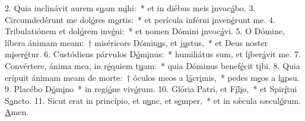 2. Quia inclinávit aurem s\uline{u}am m\uline{i}hi:~* et in diébus meis \uline{i}nvoc\uline{á}bo.
3. Circumdedérunt me dol\uline{ó}res m\uline{o}rtis:~* et perícula inférni \uline{i}nven\uline{é}runt me.
4. Tribulatiónem et dol\uline{ó}rem inv\uline{é}ni:~* et nomen Dómini \uline{i}nvoc\uline{á}vi.
5. O Dómine, líbera ánimam meam:~† miséricors Dómin\uline{u}s, et j\uline{u}stus,~* et Deus noster m\uline{i}ser\uline{é}tur.
6. Custódiens párvulos D\uline{ó}m\uline{i}nus:~* humiliátus sum, et l\uline{i}ber\uline{á}vit me.
7. Convértere, ánima mea, in r\uline{é}quiem t\uline{u}am:~* quia Dóminus benef\uline{é}cit t\uline{i}bi.
8. Quia erípuit ánimam meam de morte:~† óculos meos a l\uline{á}cr\uline{i}mis,~* pedes m\uline{e}os a l\uline{a}psu.
9. Placébo D\uline{ó}m\uline{i}no~* in regi\uline{ó}ne viv\uline{ó}rum.
10. Glória Patri, et F\uline{í}l\uline{i}o,~* et Spir\uline{í}tui S\uline{a}ncto.
11. Sicut erat in princípio, et n\uline{u}nc, et s\uline{e}mper,~* et in sǽcula sæcul\uline{ó}rum. \uline{A}men.
